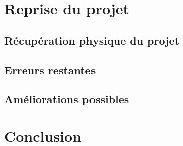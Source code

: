 \documentclass[
    iai, %
    il, %
]{heig-tb}
\begin{document}
\chapter{Reprise du projet}

\section{Récupération physique du projet}

\section{Erreurs restantes}

\section{Améliorations possibles}





\chapter{Conclusion}

\end{document}
